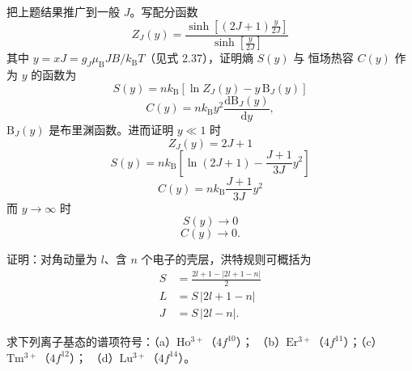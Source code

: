  把上题结果推广到一般 $J$。写配分函数
\begin{equation*}
Z_J(y) = \frac{\sinh[(2J+1)\frac{y}{2J}]}{\sinh[\frac{y}{2J}]}\tag{2.77}
\end{equation*}
其中 $y=xJ=g_J\mu_{\mathrm{B}}JB/k_{\mathrm{B}}T$（见式 2.37），证明熵 $S(y)$ 与
恒场热容 $C(y)$ 作为 $y$ 的函数为
\begin{equation*}
S(y) = nk_{\mathrm{B}}[\ln Z_J(y) - y\,\mathrm{B}_J(y)]\tag{2.78}
\end{equation*}
\begin{equation*}
C(y) = nk_{\mathrm{B}}y^{2}\frac{\mathrm{dB}_J(y)}{\mathrm{d}y},\tag{2.79}
\end{equation*}
$\mathrm{B}_J(y)$ 是布里渊函数。进而证明 $y\ll1$ 时
\begin{equation*}
Z_J(y) = 2J+1\tag{2.80}
\end{equation*}
\begin{equation*}
S(y) = nk_{\mathrm{B}}\left[\ln(2J+1) - \frac{J+1}{3J}y^{2}\right]\tag{2.81}
\end{equation*}
\begin{equation*}
C(y) = nk_{\mathrm{B}}\frac{J+1}{3J}y^{2}\tag{2.82}
\end{equation*}
而 $y\to\infty$ 时
\begin{equation*}
S(y)\to 0\tag{2.83}
\end{equation*}
\begin{equation*}
C(y)\to 0.\tag{2.84}
\end{equation*}

 证明：对角动量为 $l$、含 $n$ 个电子的壳层，洪特规则可概括为
\begin{equation*}
\begin{aligned}
S &= \frac{2l+1-|2l+1-n|}{2}\\
L &= S\,|2l+1-n|\\
J &= S\,|2l-n|.
\end{aligned}
\end{equation*}

 求下列离子基态的谱项符号：（a）$\mathrm{Ho^{3+}}$（$4f^{10}$）；
（b）$\mathrm{Er^{3+}}$（$4f^{11}$）；（c）$\mathrm{Tm^{3+}}$（$4f^{12}$）；
（d）$\mathrm{Lu^{3+}}$（$4f^{14}$）。

